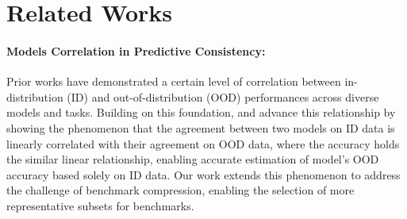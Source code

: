 \section{Related Works}
\label{apd:related_works}
\paragraph{Models Correlation in Predictive Consistency:} Prior works \citep{taori2020measuring, miller2021accuracy, awadalla2022exploring} have demonstrated a certain level of correlation between in-distribution (ID) and out-of-distribution (OOD) performances across diverse models and tasks. Building on this foundation, \cite{baek2022agreement} and \cite{mehra2024predicting} advance this relationship by showing the phenomenon that the agreement between two models on ID data is linearly correlated with their agreement on OOD data, where the accuracy holds the similar linear relationship, enabling accurate estimation of model's OOD accuracy based solely on ID data. Our work extends this phenomenon to address the challenge of benchmark compression, enabling the selection of more representative subsets for benchmarks. 

